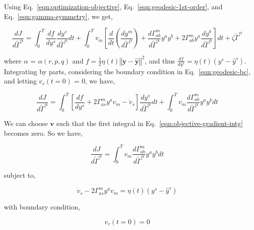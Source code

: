 \documentclass{article}
\begin{document}
Using Eq.~\ref{eqn:optimization-objective},
Eq.~\ref{eqn:geodesic-1st-order}, and Eq.~\ref{eqn:gamma-symmetry}, we
get,

\begin{equation}\label{eqn:objective-gradient-raw}
\frac{d J}{d \tilde{\Gamma}^{\alpha}} = \int_{0}^{T}
\frac{df}{dy^{s}}\frac{d y^{s}}{d \tilde{\Gamma}^{\alpha}} dt +
\int_{0}^{T} v_{m} \left[ \frac{d}{dt}(\frac{d y^{m}}{d
    \tilde{\Gamma}^{\alpha}}) + \frac{d \Gamma^{m}_{ab}}{d
    \tilde{\Gamma}^{\alpha}} y^{a} y^{b} + 2 \Gamma^{m}_{ab} y^{a}
  \frac{d y^{b}}{d \tilde{\Gamma}^{\alpha}} \right] dt + \zeta
\tilde{\Gamma}^{\alpha}
\end{equation}

where $\alpha$ = $\alpha(r,p,q)$ and $f = \frac{1}{2} \eta(t)
\left\Vert\boldsymbol{y} - \hat{\boldsymbol{y}}\right\Vert^{2}$, and
thus $\frac{df}{dy^{s}} = \eta(t) \left( y^{s} - \hat{y}^{s}
\right)$. Integrating by parts, considering the boundary condition in
Eq.~\ref{eqn:geodesic-bc}, and letting $v_{r}(t = 0)$ = 0, we have,

\begin{equation}\label{eqn:objective-gradient-intg}
\frac{d J}{d \tilde{\Gamma}^{\alpha}} = \int_{0}^{T} \left[
  \frac{df}{dy^{s}} + 2 \Gamma^{m}_{as} y^{a} v_{m} - \dot{v}_{s}
  \right] \frac{d y^{s}}{d \tilde{\Gamma}^{\alpha}} dt + \int_{0}^{T}
v_{m} \frac{d \Gamma^{m}_{ab}}{d \tilde{\Gamma}^{\alpha}} y^{a} y^{b}
dt
\end{equation}

We can choose $\boldsymbol{v}$ such that the first integral in
Eq.~\ref{eqn:objective-gradient-intg} becomes zero. So we have,

\begin{equation}\label{eqn:objective-gradient}
\frac{d J}{d \tilde{\Gamma}^{\alpha}} = \int_{0}^{T} v_{m} \frac{d
  \Gamma^{m}_{ab}}{d \tilde{\Gamma}^{\alpha}} y^{a} y^{b} dt
\end{equation}

subject to,

\begin{equation}\label{eqn:adjoint-equation}
\dot{v}_{s} - 2 \Gamma^{m}_{as} y^{a} v_{m} = \eta(t) ( y^{s} -
\hat{y}^{s} )
\end{equation}

with boundary condition,

\begin{equation}\label{eqn:adjoint-bc}
v_{r}( t = 0 ) = 0  
\end{equation}
\end{document}
